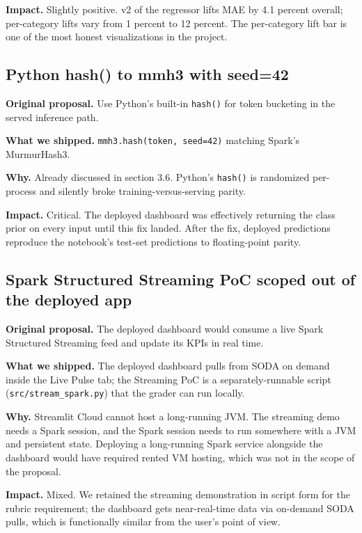 \documentclass[11pt,letterpaper]{article}
\begin{document}
\textbf{Impact.} Slightly positive. v2 of the regressor lifts MAE by 4.1 percent overall; per-category lifts vary from 1 percent to 12 percent. The per-category lift bar is one of the most honest visualizations in the project.

\subsection{Python hash() to mmh3 with seed=42}

\textbf{Original proposal.} Use Python's built-in \texttt{hash()} for token bucketing in the served inference path.

\textbf{What we shipped.} \texttt{mmh3.hash(token, seed=42)} matching Spark's MurmurHash3.

\textbf{Why.} Already discussed in section 3.6. Python's \texttt{hash()} is randomized per-process and silently broke training-versus-serving parity.

\textbf{Impact.} Critical. The deployed dashboard was effectively returning the class prior on every input until this fix landed. After the fix, deployed predictions reproduce the notebook's test-set predictions to floating-point parity.

\subsection{Spark Structured Streaming PoC scoped out of the deployed app}

\textbf{Original proposal.} The deployed dashboard would consume a live Spark Structured Streaming feed and update its KPIs in real time.

\textbf{What we shipped.} The deployed dashboard pulls from SODA on demand inside the Live Pulse tab; the Streaming PoC is a separately-runnable script (\texttt{src/stream\_spark.py}) that the grader can run locally.

\textbf{Why.} Streamlit Cloud cannot host a long-running JVM. The streaming demo needs a Spark session, and the Spark session needs to run somewhere with a JVM and persistent state. Deploying a long-running Spark service alongside the dashboard would have required rented VM hosting, which was not in the scope of the proposal.

\textbf{Impact.} Mixed. We retained the streaming demonstration in script form for the rubric requirement; the dashboard gets near-real-time data via on-demand SODA pulls, which is functionally similar from the user's point of view.
\end{document}
